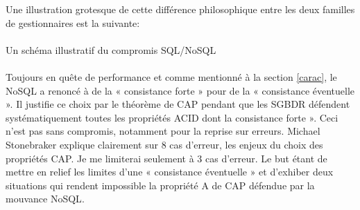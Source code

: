 Une illustration grotesque de cette différence philosophique entre 
les deux familles de gestionnaires est la suivante:
\\
\\    
{\color{red} Un schéma illustratif du compromis SQL/NoSQL}
\\
\\
Toujours en quête de performance et comme mentionné à la section \ref{carac}, 
le \textsf{NoSQL} a renoncé à de la « \textsf{consistance forte} » pour de la « \textsf{consistance éventuelle} ». Il justifie ce choix par le théorème de \textsf{CAP} pendant que les \textsf{SGBDR} défendent systématiquement toutes les propriétés \textsf{ACID} dont la \textsf{consistance forte} ». Ceci n'est pas sans compromis, notamment 
pour la reprise sur erreurs. 
\textsf{Michael Stonebraker} explique clairement sur 8 cas d'erreur,  
les enjeux du choix
des propriétés \textsf{CAP}\cite{MichaelStonebraker2}. Je me limiterai seulement à
3 cas d'erreur. Le but étant de mettre en relief les limites d'une « \textsf{consistance éventuelle} »
et d'exhiber deux situations qui rendent impossible la propriété \textsf{A} de \textsf{CAP} défendue par la mouvance \textsf{NoSQL}.
\def\exempleA{We assume a typical hardware model of a
collection of local processing and storage nodes assembled into a cluster using LAN networking.
The clusters, in turn, are wired together using WAN networking.
Let’s start with a discussion of what causes errors in databases:}

\def\exemple{Dans l'illustration qu'il a utilisé, \textsf{Michael Stonebraker} a considéré un ensemble de clusters interconnectés via un réseau \textsf{WAN}. 
Les nœuds à l'intérieur d'un cluster utilisent le \textsf{LAN} pour échanger. Ci-dessous trois cas d'erreur possibles:}

\def\casaA{Application errors. The application performed one or more incorrect updates. Generally, this is
not discovered for minutes to hours thereafter. The database must be
backed up to a point before the offending transaction(s), and
subsequent activity redone.}

\def\casa{Erreur au niveau de la couche application. Une application effectue une ou plusieurs mises à jour incorrectes. De telles erreurs ne sont généralement pas détectées dans les minutes qui suivent afin de revenir sur une version précédente de la base avant les mises à jour incorrectes.}

